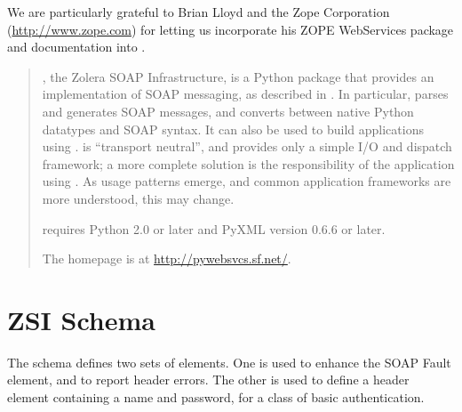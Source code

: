 \documentclass{manual}
\begin{document}
We are particularly grateful to Brian Lloyd and the Zope Corporation
(\url{http://www.zope.com}) for letting us incorporate his ZOPE
WebServices package and documentation into \ZSI{}.
\begin{abstract}
\noindent
\ZSI{}, the Zolera SOAP Infrastructure, is a Python package that
provides an implementation of SOAP messaging, as described in
.
In particular, \ZSI{} parses and generates SOAP messages, and
converts between native Python datatypes and SOAP syntax.
It can also be used to build applications using
.
\ZSI{} is ``transport neutral'', and provides only a simple
I/O and dispatch framework; a more complete solution is the
responsibility of the application using \ZSI{}.
As usage patterns emerge, and common application frameworks are
more understood, this may change.

\ZSI{} requires Python 2.0 or later and PyXML version 0.6.6 or later.

The \ZSI{} homepage is at \url{http://pywebsvcs.sf.net/}.

\end{abstract}

\tableofcontents{}













\chapter{ZSI Schema}

The \ZSI{} schema defines two sets of elements.  One is used to enhance
the SOAP Fault  element, and to report header errors.
The other is used to define a header element containing a name and
password, for a class of basic authentication.


\end{document}
